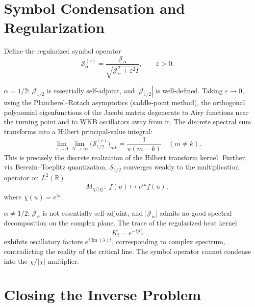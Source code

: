 \documentclass[12pt,a4paper]{amsart}
\theoremstyle{plain}
\theoremstyle{definition}
\theoremstyle{remark}
\begin{document}
\section{Symbol Condensation and Regularization}

Define the regularized symbol operator
\[
\mathcal{S}_\alpha^{(\varepsilon)}=\frac{\mathcal{J}_\alpha}{\sqrt{\mathcal{J}_\alpha^2+\varepsilon^2 I}},\qquad\varepsilon>0.
\]

\textbf{$\alpha=1/2$}: $\mathcal{J}_{1/2}$ is essentially self-adjoint, and $|\mathcal{J}_{1/2}|$ is well-defined. Taking $\varepsilon\to 0$, using the Plancherel--Rotach asymptotics (saddle-point method), the orthogonal polynomial eigenfunctions of the Jacobi matrix degenerate to Airy functions near the turning point and to WKB oscillators away from it. The discrete spectral sum transforms into a Hilbert principal-value integral:
\[
\lim_{\varepsilon\to 0}\lim_{N\to\infty}\bigl(\mathcal{S}_{1/2}^{(\varepsilon)}\bigr)_{mk}=\frac{1}{\pi(m-k)}\quad(m\neq k).
\]
This is precisely the discrete realization of the Hilbert transform kernel. Further, via Berezin--Toeplitz quantization, $\mathcal{S}_{1/2}$ converges weakly to the multiplication operator on $L^2(\mathbb{R})$
\[
M_{\chi/|\chi|}:\;f(u)\mapsto e^{iu}f(u),
\]
where $\chi(u)=e^{iu}$.

\textbf{$\alpha\neq 1/2$}: $\mathcal{J}_\alpha$ is not essentially self-adjoint, and $|\mathcal{J}_\alpha|$ admits no good spectral decomposition on the complex plane. The trace of the regularized heat kernel
\[
K_t=e^{-t\mathcal{J}_\alpha^2}
\]
exhibits oscillatory factors $e^{i\operatorname{Im}(\lambda)t}$, corresponding to complex spectrum, contradicting the reality of the critical line. The symbol operator cannot condense into the $\chi/|\chi|$ multiplier.

\section{Closing the Inverse Problem}
\end{document}
